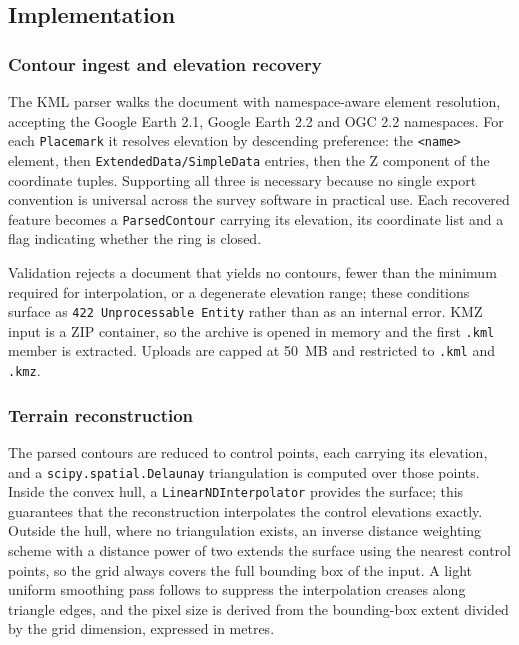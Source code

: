 \documentclass[sigconf,review,10pt]{acmart}
\newcommand{\cb}{\allowbreak}
\newcommand{\codelong}[1]{\texttt{#1}}
\begin{document}
\subsection{Implementation}
\label{sec:impl}

\subsubsection{Contour ingest and elevation recovery}

The KML parser walks the document with namespace-aware element
resolution, accepting the Google Earth 2.1, Google Earth 2.2 and OGC 2.2
namespaces. For each \texttt{Placemark} it resolves elevation by
descending preference: the \texttt{<name>} element, then
\codelong{ExtendedData/\cb{}SimpleData} entries, then the Z component of the
coordinate tuples. Supporting all three is necessary because no single
export convention is universal across the survey software in practical
use. Each recovered feature becomes a \texttt{ParsedContour} carrying its
elevation, its coordinate list and a flag indicating whether the ring is
closed.

Validation rejects a document that yields no contours, fewer than the
minimum required for interpolation, or a degenerate elevation range; these
conditions surface as \codelong{422 Unprocessable Entity} rather than as an
internal error. KMZ input is a ZIP container, so the archive is opened in
memory and the first \texttt{.kml} member is extracted. Uploads are
capped at 50~MB and restricted to \texttt{.kml} and \texttt{.kmz}.

\subsubsection{Terrain reconstruction}

The parsed contours are reduced to control points, each carrying its
elevation, and a \codelong{scipy.\cb{}spatial.\cb{}Delaunay} triangulation is computed
over those points. Inside the convex hull, a \codelong{LinearNDInterpolator}
provides the surface; this guarantees that the reconstruction interpolates
the control elevations exactly. Outside the hull, where no triangulation
exists, an inverse distance weighting scheme with a distance power of two
extends the surface using the nearest control points, so the grid always
covers the full bounding box of the input. A light uniform smoothing pass
follows to suppress the interpolation creases along triangle edges, and
the pixel size is derived from the bounding-box extent divided by the grid
dimension, expressed in metres.
\end{document}
